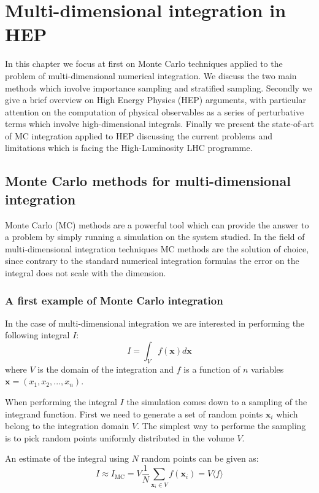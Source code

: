\documentclass[../main/main.tex]{subfiles}
\begin{document}
\chapter[Multi-dimensional integration in HEP]{Multi-dimensional integration in HEP}
In this chapter we focus at first on Monte Carlo techniques applied to the problem of multi-dimensional numerical integration.
We discuss the two main methods which involve importance sampling and stratified sampling.
Secondly we give a brief overview on High Energy Physics (HEP) arguments, with particular attention 
on the computation of physical observables as a series of perturbative terms which involve high-dimensional integrals.
Finally we present the state-of-art of  MC integration applied to HEP discussing the current problems and limitations which
is facing the High-Luminosity LHC programme.

\section{Monte Carlo methods for multi-dimensional integration}
Monte Carlo (MC) methods are a powerful tool which can provide the answer to a 
problem by simply running a simulation on the system studied.
In the field of multi-dimensional integration techniques MC methods are the solution of choice, since contrary 
to the standard numerical integration formulas  the error on the integral does not scale with the dimension. 


\subsection{A first example of Monte Carlo integration}
In the case of multi-dimensional integration we are interested in performing the following
integral $I$:
\begin{equation}
	I = \int_{V}   f(\textbf{x}) d \textbf{x} 
\end{equation}
where $V$ is the domain of the integration and $f$ is a function of $n$ variables 
$\textbf{x} = (x_1,x_2, ..., x_n)$.

When performing the integral $I$ the simulation comes down to a sampling of the integrand function.
First we need to generate a set of random points $\textbf{x}_i$ which belong to the integration domain $V$.
The simplest way to performe the sampling is to pick random points uniformly distributed 
in the volume $V$.

An estimate of the integral using $N$ random points can be given as:
\begin{equation}
	I \approx I_{\text{MC}} = V \frac{1}{N} \sum_{\textbf{x}_i \in V} f(\textbf{x}_i) = V \langle f \rangle
\end{equation}
\end{document}
